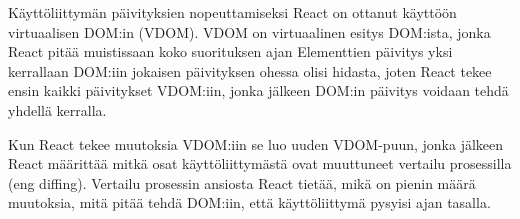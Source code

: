 Käyttöliittymän päivityksien nopeuttamiseksi React on ottanut käyttöön virtuaalisen DOM:in (VDOM).
VDOM on virtuaalinen esitys DOM:ista, jonka React pitää muistissaan koko suorituksen ajan
Elementtien päivitys yksi kerrallaan DOM:iin jokaisen päivityksen ohessa olisi hidasta,
joten React tekee ensin kaikki päivitykset VDOM:iin, jonka jälkeen DOM:in päivitys voidaan tehdä yhdellä kerralla.
%
%
\medskip

Kun React tekee muutoksia VDOM:iin se luo uuden VDOM-puun, jonka jälkeen
React määrittää mitkä osat käyttöliittymästä ovat muuttuneet vertailu prosessilla (eng diffing).
Vertailu prosessin ansiosta React tietää, mikä on pienin määrä muutoksia, mitä pitää tehdä DOM:iin, 
että käyttöliittymä pysyisi ajan tasalla.
\medskip



